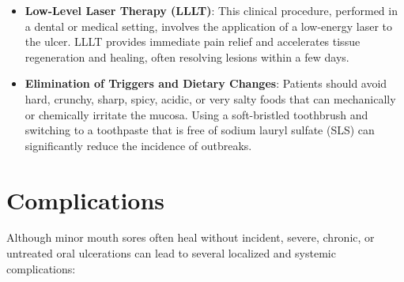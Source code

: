 \begin{itemize}
    \item \textbf{Low-Level Laser Therapy (LLLT)}: This clinical procedure, performed in a dental or medical setting, involves the application of a low-energy laser to the ulcer. LLLT provides immediate pain relief and accelerates tissue regeneration and healing, often resolving lesions within a few days.
    \item \textbf{Elimination of Triggers and Dietary Changes}: Patients should avoid hard, crunchy, sharp, spicy, acidic, or very salty foods that can mechanically or chemically irritate the mucosa. Using a soft-bristled toothbrush and switching to a toothpaste that is free of sodium lauryl sulfate (SLS) can significantly reduce the incidence of outbreaks.
\end{itemize}

\section*{Complications}
Although minor mouth sores often heal without incident, severe, chronic, or untreated oral ulcerations can lead to several localized and systemic complications:
